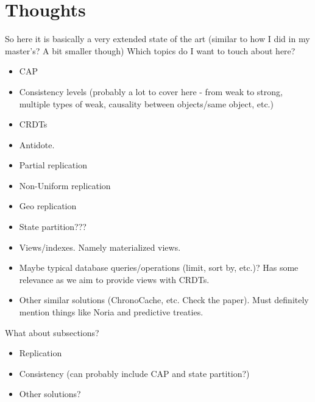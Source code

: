 





\section{Thoughts}

So here it is basically a very extended state of the art (similar to how I did in my master's? A bit smaller though)
Which topics do I want to touch about here?
\begin{itemize}
	\item CAP
	\item Consistency levels (probably a lot to cover here - from weak to strong, multiple types of weak, causality between objects/same object, etc.)
	\item CRDTs
	\item Antidote.
	\item Partial replication
	\item Non-Uniform replication
	\item Geo replication
	\item State partition???
	\item Views/indexes. Namely materialized views.
	\item Maybe typical database queries/operations (limit, sort by, etc.)? Has some relevance as we aim to provide views with CRDTs.
	\item Other similar solutions (ChronoCache, etc. Check the paper). Must definitely mention things like Noria and predictive treaties.
\end{itemize}

What about subsections?
\begin{itemize}
	\item Replication
	\item Consistency (can probably include CAP and state partition?)
	\item Other solutions?
\end{itemize}

